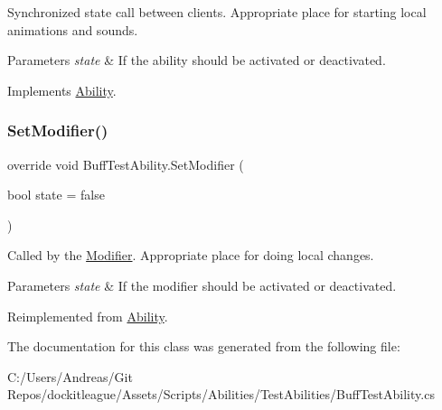 Synchronized state call between clients. Appropriate place for starting local animations and sounds. 


\begin{DoxyParams}{Parameters}
{\em state} & If the ability should be activated or deactivated.\\
\hline
\end{DoxyParams}


Implements \hyperlink{class_ability_a10f7f3c2b63eeef6e352aee48d246384}{Ability}.

\hypertarget{class_buff_test_ability_a24f2ac23a4f1644af087c1e4162f4267}{}\label{class_buff_test_ability_a24f2ac23a4f1644af087c1e4162f4267} 
\subsubsection{\texorpdfstring{Set\+Modifier()}{SetModifier()}}
{\footnotesize\ttfamily override void Buff\+Test\+Ability.\+Set\+Modifier (\begin{DoxyParamCaption}\item[{bool}]{state = {\ttfamily false} }\end{DoxyParamCaption})\hspace{0.3cm}{\ttfamily [virtual]}}



Called by the \hyperlink{class_modifier}{Modifier}. Appropriate place for doing local changes. 


\begin{DoxyParams}{Parameters}
{\em state} & If the modifier should be activated or deactivated.\\
\hline
\end{DoxyParams}


Reimplemented from \hyperlink{class_ability_a18f5361c45dc334b541892880382c098}{Ability}.



The documentation for this class was generated from the following file\+:\begin{DoxyCompactItemize}
\item 
C\+:/\+Users/\+Andreas/\+Git Repos/dockitleague/\+Assets/\+Scripts/\+Abilities/\+Test\+Abilities/Buff\+Test\+Ability.\+cs\end{DoxyCompactItemize}

